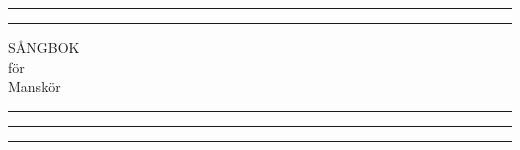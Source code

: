 \documentclass{book}
\begin{document}
	\setcounter{secnumdepth}{-1}
	\setlength{\footskip}{70pt}

	\begin{titlepage} %

		\centering %


		\rule{\textwidth}{1pt} %

		\vspace{2pt}\vspace{-\baselineskip} %

		\rule{\textwidth}{0.4pt} %

		\vspace{0.1\textheight} %


		{\Huge S{\AA}NGBOK}\\[0.5\baselineskip] %
		{\large f{\"o}r}\\[0.5\baselineskip] %
		{\Huge Mansk{\"o}r} %

		\vspace{0.025\textheight} %

		\rule{0.3\textwidth}{0.4pt} %

		\vspace{0.1\textheight} %



		\vfill %





		\rule{\textwidth}{0.4pt} %

		\vspace{2pt}\vspace{-\baselineskip} %

		\rule{\textwidth}{1pt} %

	\end{titlepage}
\end{document}
